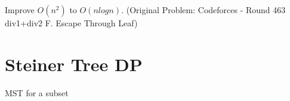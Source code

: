         Improve $O(n^2)$ to $O(nlogn)$. (Original Problem: Codeforces - Round 463 div1+div2 F. Escape Through Leaf)
        
        
        
    \section{Steiner Tree DP}

    MST for a subset
    
    
    